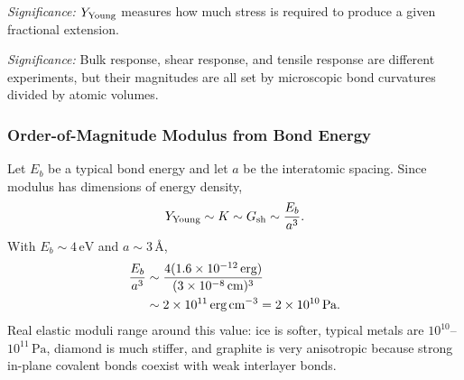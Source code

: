 
\textit{Significance:} $Y_{\rm Young}$ measures how much stress is required to
produce a given fractional extension.


\textit{Significance:} Bulk response, shear response, and tensile response are
different experiments, but their magnitudes are all set by microscopic bond
curvatures divided by atomic volumes.

\subsubsection*{Order-of-Magnitude Modulus from Bond Energy}
Let $E_b$ be a typical bond energy and let $a$ be the interatomic spacing.
Since modulus has dimensions of energy density,
\begin{equation}
    Y_{\rm Young}\sim K\sim G_{\rm sh}\sim \frac{E_b}{a^3}.
    \label{eq:lec11:modulus-energy-density-step}
\end{equation}
With $E_b\sim4\,\text{eV}$ and $a\sim3\,\text{\AA}$,
\begin{align}
    \frac{E_b}{a^3}
    &\sim
    \frac{4(1.6\times10^{-12}\,\text{erg})}
         {(3\times10^{-8}\,\text{cm})^3}
    \notag\\
    &\sim
    2\times10^{11}\,\text{erg\,cm}^{-3}
    =
    2\times10^{10}\,\text{Pa}.
    \label{eq:lec11:modulus-number}
\end{align}
Real elastic moduli range around this value: ice is softer, typical metals are
$10^{10}$--$10^{11}\,\text{Pa}$, diamond is much stiffer, and graphite is very
anisotropic because strong in-plane covalent bonds coexist with weak interlayer
bonds.

